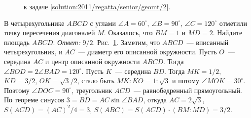 \ifsolution
\begin{figure}\centering
    \caption{к задаче \ref{solution:2011/regatta/senior/geomt/2}.}
    \label{fig:solution:2011/regatta/senior/geomt/2}
\end{figure}
\fi %

\problem
В четырехугольнике $ABCD$ с углами
$\angle A = 60^{\circ}$, $\angle B = 90^{\circ}$, $\angle C = 120^{\circ}$
отметили точку пересечения диагоналей $M$.
Оказалось, что $BM = 1$ и $MD = 2$.
Найдите площадь $ABCD$.
\solution
\label{solution:2011/regatta/senior/geomt/2}%
\emph{Ответ:} $9 / 2$.
Рис.~\ref{fig:solution:2011/regatta/senior/geomt/2}.
Заметим, что $ABCD$~--- вписанный четырехугольник, и $AC$~--- диаметр его
описанной окружности.
Пусть $O$~--- середина $AC$ и центр описанной окружности $ABCD$.
Тогда $\angle BOD = 2 \angle BAD = 120^{\circ}$.
Пусть $K$~--- середина $BD$.
Тогда $MK = 1 / 2$, $KD = 3 / 2$, $OK = \sqrt{3} / 2$, стало быть
$MK : KO = 1 : \sqrt{3}$ и потому $\angle MOK = 30^{\circ}$.
Поэтому $\angle DOC = 90^{\circ}$, треугольник $ACD$~--- равнобедренный
прямоугольный.
По теореме синусов $3 = BD = AC \sin \angle BAD$, откуда
$AC = 2 \sqrt{3}$, $S(ACD) = (AC)^2 / 4 = 3$,
$S(ABC) = S(ACD) \cdot (BM : MD) = 3 / 2$.
\endproblem
